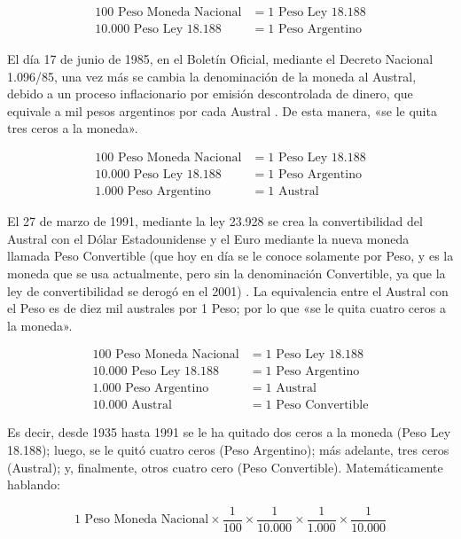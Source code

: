 \documentclass[12pt,a4paper,twoside]{book}
\begin{document}
\begin{align*}
100 \text{ Peso Moneda Nacional} &= 1 \text{ Peso Ley 18.188} \\
10.000 \text{ Peso Ley 18.188} &= 1 \text{ Peso Argentino}
\end{align*}

El día 17 de junio de 1985, en el Boletín Oficial, mediante el Decreto Nacional 1.096/85, una vez más se cambia la denominación de la moneda al Austral, debido a un proceso inflacionario por emisión descontrolada de dinero, que equivale a mil pesos argentinos por cada Austral \cite{dineroarg:austr}. De esta manera, «se le quita tres ceros a la moneda».

\begin{align*}
100 \text{ Peso Moneda Nacional} &= 1 \text{ Peso Ley 18.188} \\
10.000 \text{ Peso Ley 18.188} &= 1 \text{ Peso Argentino} \\
1.000 \text{ Peso Argentino} &= 1 \text{ Austral}
\end{align*}

El 27 de marzo de 1991, mediante la ley 23.928 se crea la convertibilidad del Austral con el Dólar Estadounidense y el Euro mediante la nueva moneda llamada Peso Convertible (que hoy en día se le conoce solamente por Peso, y es la moneda que se usa actualmente, pero sin la denominación Convertible, ya que la ley de convertibilidad se derogó en el 2001) \cite{dineroarg:act}. La equivalencia entre el Austral con el Peso es de diez mil australes por 1 Peso; por lo que «se le quita cuatro ceros a la moneda».

\begin{align*}
100 \text{ Peso Moneda Nacional} &= 1 \text{ Peso Ley 18.188} \\
10.000 \text{ Peso Ley 18.188} &= 1 \text{ Peso Argentino} \\
1.000 \text{ Peso Argentino} &= 1 \text{ Austral} \\
10.000 \text{ Austral} &= 1 \text{ Peso Convertible}
\end{align*}

Es decir, desde 1935 hasta 1991 se le ha quitado dos ceros a la moneda (Peso Ley 18.188); luego, se le quitó cuatro ceros (Peso Argentino); más adelante, tres ceros (Austral); y, finalmente, otros cuatro cero (Peso Convertible). Matemáticamente hablando:

\[
1 \text{ Peso Moneda Nacional} \times \dfrac{1}{100} \times \dfrac{1}{10.000} \times \dfrac{1}{1.000} \times \dfrac{1}{10.000}
\]
\end{document}
